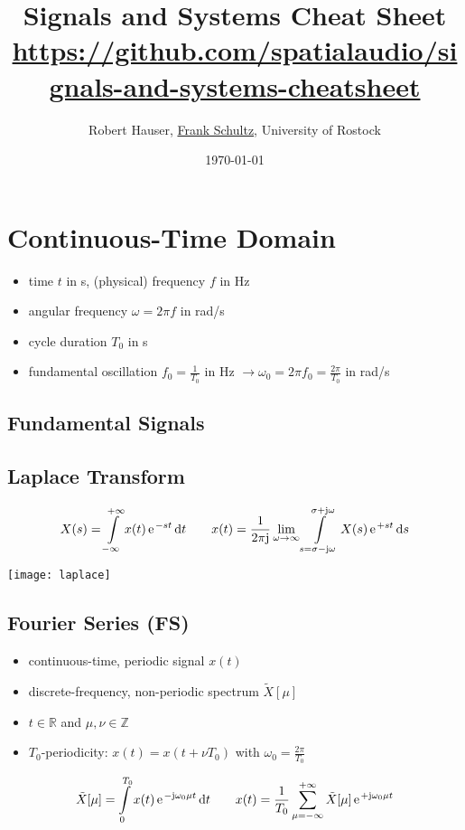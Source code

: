 \documentclass[landscape,columns=3]{cheatsheet} %
\title{Signals and Systems Cheat Sheet\\
\tiny{\url{https://github.com/spatialaudio/signals-and-systems-cheatsheet}}}
\author{
Robert Hauser,
\href{https://orcid.org/0000-0002-3010-0294}{Frank Schultz},
University of Rostock
}
\date{\today}
\begin{document}

\section{Continuous-Time Domain}
%
\begin{itemize}
\setlength\itemsep{-0.5em}
\item time $t$ in s, (physical) frequency $f$ in Hz
%
\item angular frequency $\omega = 2 \pi f$ in rad/s
%
\item cycle duration $T_0$ in s
%
\item fundamental oscillation $f_0 = \frac{1}{T_0}$ in Hz
$\rightarrow \omega_0 = 2 \pi f_0 = \frac{2\pi}{T_0}$ in rad/s
%
\end{itemize}


\subsection{Fundamental Signals}

\subsection{Laplace Transform}
%
\begin{align*}
X(s) = \int\limits_{-\infty}^{+\infty} x(t) \, \e^{-s t}\,\mathrm{d}t
\qquad
x(t) = \frac{1}{2\pi\im}\lim_{\omega\to\infty}\int\limits_{s=\sigma-\im\omega}^{\sigma+\im\omega} X(s) \,\e^{+s t}\,\mathrm{d}s
\end{align*}
\begin{minipage}{\columnwidth}
	\texttt{[image: laplace]}
\end{minipage}



\columnbreak
\subsection{Fourier Series (FS)}
%
%
%
\begin{itemize}
\setlength\itemsep{-0.5em}
\item continuous-time, periodic signal $x(t)$
%
\item discrete-frequency, non-periodic spectrum $\tilde{X}[\mu]$
%
\item $t\in\mathbb{R}$ and $\mu,\nu\in\mathbb{Z}$
%
\item  $T_0$-periodicity: $x(t)=x(t+\nu T_0)$ with $\omega_0 = \frac{2\pi}{T_0}$
%
\end{itemize}
%
\begin{align*}
\tilde{X}[\mu] = \int\limits_{0}^{T_0} x(t) \, \e^{-\im \omega_0 \mu t}\,\mathrm{d}t
\qquad
x(t) = \frac{1}{T_0}\sum\limits_{\mu=-\infty}^{+\infty} \tilde{X}[\mu] \,\e^{+\im \omega_0 \mu t}
\end{align*}
\end{document}
